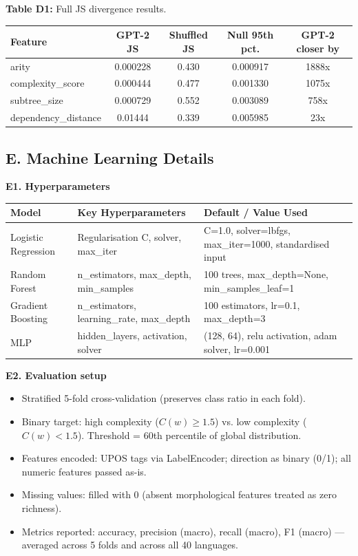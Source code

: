 \documentclass[11pt,a4paper]{article}
\begin{document}
\noindent\textbf{Table D1:} Full JS divergence results.
\begin{table}[H]
\centering\small
\begin{tabular}{@{}lcccc@{}}
\toprule
\textbf{Feature} & \textbf{GPT-2 JS} & \textbf{Shuffled JS} & \textbf{Null 95th pct.} & \textbf{GPT-2 closer by} \\
\midrule
arity                & 0.000228 & 0.430 & 0.000917 & 1888x \\
complexity\_score    & 0.000444 & 0.477 & 0.001330 & 1075x \\
subtree\_size        & 0.000729 & 0.552 & 0.003089 & 758x  \\
dependency\_distance & 0.01444  & 0.339 & 0.005985 & 23x   \\
\bottomrule
\end{tabular}
\end{table}

\subsection*{E. Machine Learning Details}

\noindent\textbf{E1. Hyperparameters}
\begin{table}[H]
\centering\small
\begin{tabular}{@{}lll@{}}
\toprule
\textbf{Model} & \textbf{Key Hyperparameters} & \textbf{Default / Value Used} \\
\midrule
Logistic Regression & Regularisation C, solver, max\_iter      & C=1.0, solver=lbfgs, max\_iter=1000, standardised input \\
Random Forest       & n\_estimators, max\_depth, min\_samples  & 100 trees, max\_depth=None, min\_samples\_leaf=1 \\
Gradient Boosting   & n\_estimators, learning\_rate, max\_depth & 100 estimators, lr=0.1, max\_depth=3 \\
MLP                 & hidden\_layers, activation, solver       & (128, 64), relu activation, adam solver, lr=0.001 \\
\bottomrule
\end{tabular}
\end{table}

\noindent\textbf{E2. Evaluation setup}
\begin{itemize}[leftmargin=*, itemsep=1pt, parsep=0pt, topsep=2pt]
\item Stratified 5-fold cross-validation (preserves class ratio in each fold).
\item Binary target: high complexity ($C(w) \geq 1.5$) vs. low complexity ($C(w) < 1.5$). Threshold = 60th percentile of global distribution.
\item Features encoded: UPOS tags via LabelEncoder; direction as binary (0/1); all numeric features passed as-is.
\item Missing values: filled with 0 (absent morphological features treated as zero richness).
\item Metrics reported: accuracy, precision (macro), recall (macro), F1 (macro) --- averaged across 5 folds and across all 40 languages.
\end{itemize}
\end{document}
